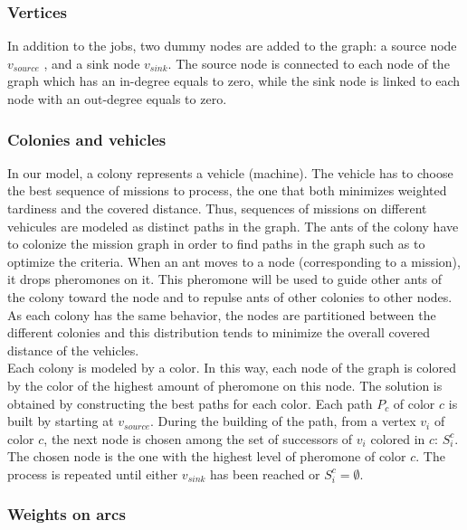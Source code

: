 \documentclass[a4paper,10pt]{article}
\begin{document}
\subsubsection{Vertices}

In addition to the jobs, two dummy nodes are added to the graph: a source node $v_{source}$ , and a sink node $v_{sink}$. The source node is connected to each node of the graph which has an in-degree equals to zero, while the sink node is linked to each node with an out-degree equals to zero. %

\subsubsection{Colonies and vehicles}

In our model, a colony represents a vehicle (machine). The vehicle has to choose the best sequence of missions to process, the one that both minimizes weighted tardiness and the covered distance. Thus, sequences of missions on different vehicules are modeled as distinct paths in the graph. The ants of the colony have to colonize the mission graph in order to find paths in the graph such as to optimize the criteria. When an ant moves to a node (corresponding to a mission), it drops pheromones on it. This pheromone will be used to guide other ants of the colony toward the node and to repulse ants of other colonies to other nodes. As each colony has the same behavior, the nodes are partitioned between the different colonies and this distribution tends to minimize the overall covered distance of the vehicles.\\

Each colony is modeled by a color. In this way, each node of the graph is colored by the color of the highest amount of pheromone on this node. The solution is obtained by constructing the best paths for each color. Each path $P_c$ of color $c$ is built by starting at $v_{source}$. During the building of the path, from a vertex $v_i$ of color $c$, the next node is chosen among the set of successors of $v_i$ colored in $c$: $S_i^c$. The chosen node is the one with the highest level of pheromone of color $c$. The process is repeated until either $v_{sink}$ has been reached or $S_i^c = \emptyset$.

\subsubsection{Weights on arcs}
\end{document}
